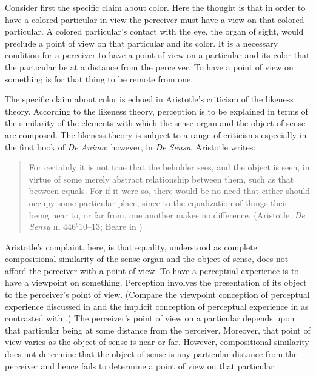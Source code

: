 Consider first the specific claim about color. Here the thought is that in order to have a colored particular in view the perceiver must have a view on that colored particular. A colored particular's contact with the eye, the organ of sight, would preclude a point of view on that particular and its color. It is a necessary condition for a perceiver to have a point of view on a particular and its color that the particular be at a distance from the perceiver. To have a point of view on something is for that thing to be remote from one.

The specific claim about color is echoed in Aristotle's criticism of the likeness theory. According to the likeness theory, perception is to be explained in terms of the similarity of the elements with which the sense organ and the object of sense are composed. The likeness theory is subject to a range of criticisms especially in the first book of \emph{De Anima}; however, in \emph{De Sensu}, Aristotle writes:
\begin{quote}
	For certainly it is not true that the beholder sees, and the object is seen, in virtue of some merely abstract relationship between them, such as that between equals. For if it were so, there would be no need that either should occupy some particular place; since to the equalization of things their being near to, or far from, one another makes no difference. (Aristotle, \emph{De Sensu} \textsc{iii} 446\( ^{b} \)10--13; Beare in \citealt[20]{Barnes:1984uq})
\end{quote}
Aristotle's complaint, here, is that equality, understood as complete compositional similarity of the sense organ and the object of sense, does not afford the perceiver with a point of view. To have a perceptual experience is to have a viewpoint on something. Perception involves the presentation of its object to the perceiver's point of view. (Compare the viewpoint conception of perceptual experience discussed in \citealt{Martin:1998nx} and the implicit conception of perceptual experience in \citealt{Nagel:1979fk} as contrasted with \citealt{Jackson:1982my}.) The perceiver's point of view on a particular depends upon that particular being at some distance from the perceiver. Moreover, that point of view varies as the object of sense is near or far. However, compositional similarity does not determine that the object of sense is any particular distance from the perceiver and hence fails to determine a point of view on that particular.

